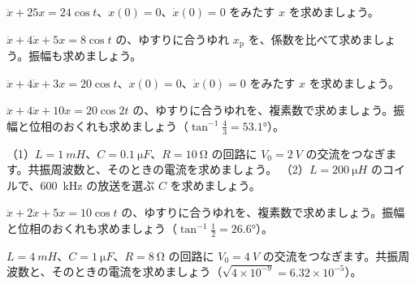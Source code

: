 \bkproblem $\ddot x+25x=24\cos t$、$x(0)=0$、$\dot x(0)=0$ をみたす $x$ を求めましょう。

\bkproblem $\ddot x+4\dot x+5x=8\cos t$ の、ゆすりに合うゆれ $x_{\mathrm p}$ を、係数を比べて求めましょう。振幅も求めましょう。

\bkproblem $\ddot x+4\dot x+3x=20\cos t$、$x(0)=0$、$\dot x(0)=0$ をみたす $x$ を求めましょう。

\bkproblem $\ddot x+4\dot x+10x=20\cos2t$ の、ゆすりに合うゆれを、複素数で求めましょう。振幅と位相のおくれも求めましょう（$\tan^{-1}\frac43=53.1°$）。

\bkproblem （1）$L=\qty{1}{mH}$、$C=\qty{0.1}{\micro F}$、$R=\qty{10}{\ohm}$ の回路に $V_0=\qty{2}{V}$ の交流をつなぎます。共振周波数と、そのときの電流を求めましょう。\newline
（2）$L=\qty{200}{\micro H}$ のコイルで、\qty{600}{kHz} の放送を選ぶ $C$ を求めましょう。

\bkproblem $\ddot x+2\dot x+5x=10\cos t$ の、ゆすりに合うゆれを、複素数で求めましょう。振幅と位相のおくれも求めましょう（$\tan^{-1}\frac12=26.6°$）。

\bkproblem $L=\qty{4}{mH}$、$C=\qty{1}{\micro F}$、$R=\qty{8}{\ohm}$ の回路に $V_0=\qty{4}{V}$ の交流をつなぎます。共振周波数と、そのときの電流を求めましょう（$\sqrt{4\times10^{-9}}=6.32\times10^{-5}$）。



